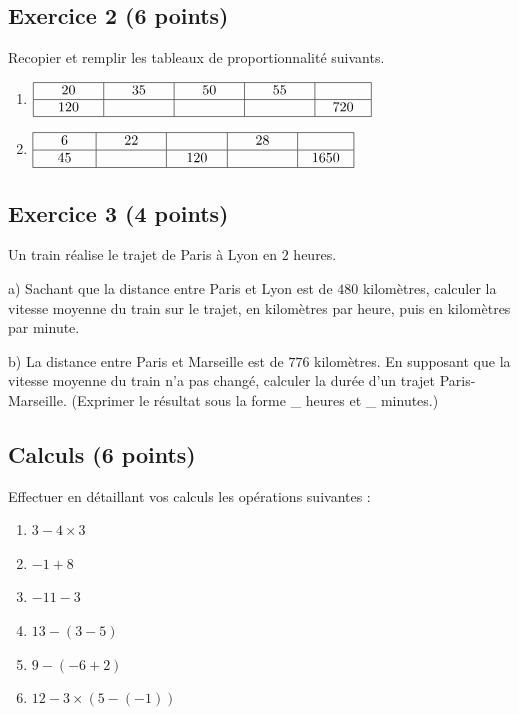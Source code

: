 \documentclass[14 pt]{extarticle}
\theoremstyle{plain}
\begin{document}
\subsection*{Exercice 2 (6 points)}

Recopier et remplir les tableaux de proportionnalité suivants. 

\begin{enumerate}
\item $\renewcommand{\arraystretch}{1}
\begin{array}{|c|c|c|c|c|}
\hline
\phantom{000}20 \phantom{000} & \phantom{000}35\phantom{000} & \phantom{000}50 \phantom{000}&  \phantom{000}55\phantom{000} & \phantom{000} \phantom{000} \\
\hline
120 & \phantom{700} &   & & 720 \\
\hline
\end{array}
\renewcommand{\arraystretch}{1}$

\item $\renewcommand{\arraystretch}{1}
\begin{array}{|c|c|c|c|c|}
\hline
\phantom{000}6\phantom{000} & \phantom{000}22\phantom{000} & \phantom{000} \ \phantom{000} & \phantom{000}28\phantom{000}& \phantom{000}\phantom{000}   \\
\hline
45 &   & 120& &1650\\
\hline
\end{array}
\renewcommand{\arraystretch}{1}$
\end{enumerate}

\subsection*{Exercice 3 (4 points)}

Un train réalise le trajet de Paris à Lyon en $2$ heures. 

a) Sachant que la distance entre Paris et Lyon est de $480$ 
kilomètres, calculer la vitesse moyenne du train sur le trajet, en kilomètres par heure, puis en kilomètres par minute. 

b) La distance entre Paris et Marseille est de $776$ kilomètres. En 
supposant que la vitesse moyenne du train n'a pas changé, calculer la durée d'un trajet Paris-Marseille. (Exprimer le résultat sous la forme \_ heures et \_ minutes.)

 
 \newpage
 
 
 \subsection*{Calculs (6 points)}
 Effectuer en détaillant vos calculs les opérations suivantes : 
 \begin{enumerate}
 \item $3 - 4 \times 3$
 \item $-1 + 8$
 \item $ - 11 -3$
 \item $13- (3-5)$
 \item $9 - ( - 6 +2)$
 \item $12 - 3 \times (5 - (-1))$
 \end{enumerate}
\end{document}

